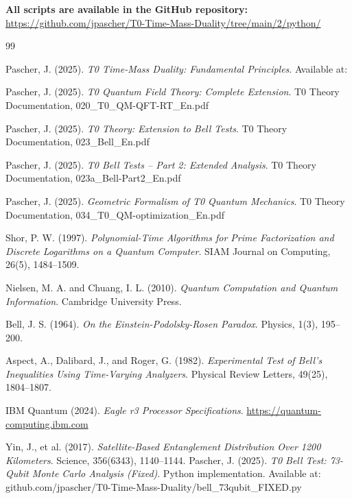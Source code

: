 \textbf{All scripts are available in the GitHub repository:} \\
\url{https://github.com/jpascher/T0-Time-Mass-Duality/tree/main/2/python/}
\begin{thebibliography}{99}
	
	Pascher, J. (2025). 
	\textit{T0 Time-Mass Duality: Fundamental Principles}. 
	Available at: 
	
	Pascher, J. (2025). 
	\textit{T0 Quantum Field Theory: Complete Extension}. 
	T0 Theory Documentation, 020\_T0\_QM-QFT-RT\_En.pdf
	
	Pascher, J. (2025). 
	\textit{T0 Theory: Extension to Bell Tests}. 
	T0 Theory Documentation, 023\_Bell\_En.pdf
	
	Pascher, J. (2025). 
	\textit{T0 Bell Tests -- Part 2: Extended Analysis}. 
	T0 Theory Documentation, 023a\_Bell-Part2\_En.pdf
	
	Pascher, J. (2025). 
	\textit{Geometric Formalism of T0 Quantum Mechanics}. 
	T0 Theory Documentation, 034\_T0\_QM-optimization\_En.pdf
	
	Shor, P. W. (1997). 
	\textit{Polynomial-Time Algorithms for Prime Factorization and Discrete Logarithms on a Quantum Computer}. 
	SIAM Journal on Computing, 26(5), 1484--1509.
	
	Nielsen, M. A. and Chuang, I. L. (2010). 
	\textit{Quantum Computation and Quantum Information}. 
	Cambridge University Press.
	
	Bell, J. S. (1964). 
	\textit{On the Einstein-Podolsky-Rosen Paradox}. 
	Physics, 1(3), 195--200.
	
	Aspect, A., Dalibard, J., and Roger, G. (1982). 
	\textit{Experimental Test of Bell's Inequalities Using Time-Varying Analyzers}. 
	Physical Review Letters, 49(25), 1804--1807.
	
	IBM Quantum (2024). 
	\textit{Eagle r3 Processor Specifications}. 
	\url{https://quantum-computing.ibm.com}
	
	Yin, J., et al. (2017). 
	\textit{Satellite-Based Entanglement Distribution Over 1200 Kilometers}. 
	Science, 356(6343), 1140--1144.
	Pascher, J. (2025). 
	\textit{T0 Bell Test: 73-Qubit Monte Carlo Analysis (Fixed)}. 
	Python implementation. Available at: github.com/jpascher/T0-Time-Mass-Duality/bell\_73qubit\_FIXED.py
	

\end{thebibliography}

